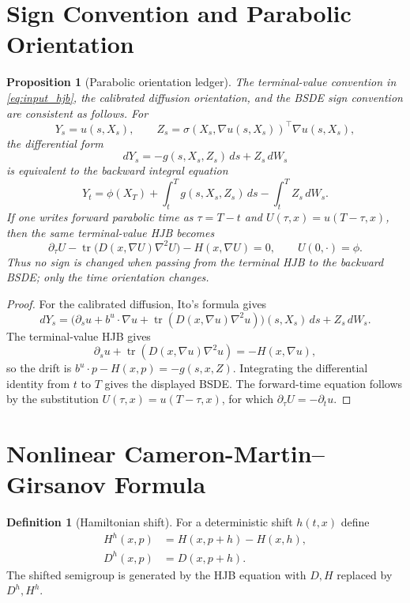 \documentclass[11pt]{amsart}
\newtheorem{proposition}[theorem]{Proposition}
\theoremstyle{definition}
\newtheorem{definition}[theorem]{Definition}
\theoremstyle{remark}
\newcommand{\Tr}{\operatorname{tr}}
\begin{document}
\section{Sign Convention and Parabolic Orientation}

\begin{proposition}[Parabolic orientation ledger]
\label{prop:parabolic_orientation_ledger}
The terminal-value convention in \cref{eq:input_hjb}, the calibrated diffusion
orientation, and the BSDE sign convention are consistent as follows.  For
\[
  Y_s=u(s,X_s),\qquad
  Z_s=\sigma(X_s,\nabla u(s,X_s))^\top\nabla u(s,X_s),
\]
the differential form
\[
  dY_s=-g(s,X_s,Z_s)\,ds+Z_s\,dW_s
\]
is equivalent to the backward integral equation
\[
  Y_t=\phi(X_T)+\int_t^T g(s,X_s,Z_s)\,ds
       -\int_t^T Z_s\,dW_s.
\]
If one writes forward parabolic time as \(\tau=T-t\) and
\(U(\tau,x)=u(T-\tau,x)\), then the same terminal-value HJB becomes
\[
  \partial_\tau U
  -\Tr\bigl(D(x,\nabla U)\nabla^2U\bigr)-H(x,\nabla U)=0,
  \qquad U(0,\cdot)=\phi .
\]
Thus no sign is changed when passing from the terminal HJB to the backward
BSDE; only the time orientation changes.
\end{proposition}

\begin{proof}
For the calibrated diffusion, Ito's formula gives
\[
  dY_s
  =
  \bigl(\partial_su+b^u\cdot\nabla u
  +\Tr(D(x,\nabla u)\nabla^2u)\bigr)(s,X_s)\,ds
  +Z_s\,dW_s .
\]
The terminal-value HJB gives
\[
  \partial_su+\Tr(D(x,\nabla u)\nabla^2u)=-H(x,\nabla u),
\]
so the drift is \(b^u\cdot p-H(x,p)=-g(s,x,Z)\).  Integrating the differential
identity from \(t\) to \(T\) gives the displayed BSDE.  The forward-time
equation follows by the substitution \(U(\tau,x)=u(T-\tau,x)\), for which
\(\partial_\tau U=-\partial_tu\).
\end{proof}

\section{Nonlinear Cameron-Martin--Girsanov Formula}

\begin{definition}[Hamiltonian shift]
\label{def:hamiltonian_shift}
For a deterministic shift $h(t,x)$ define
\begin{align}
  H^h(x,p)&=H(x,p+h)-H(x,h),\\
  D^h(x,p)&=D(x,p+h).
\end{align}
The shifted semigroup is generated by the HJB equation with $D,H$ replaced by
$D^h,H^h$.
\end{definition}
\end{document}
